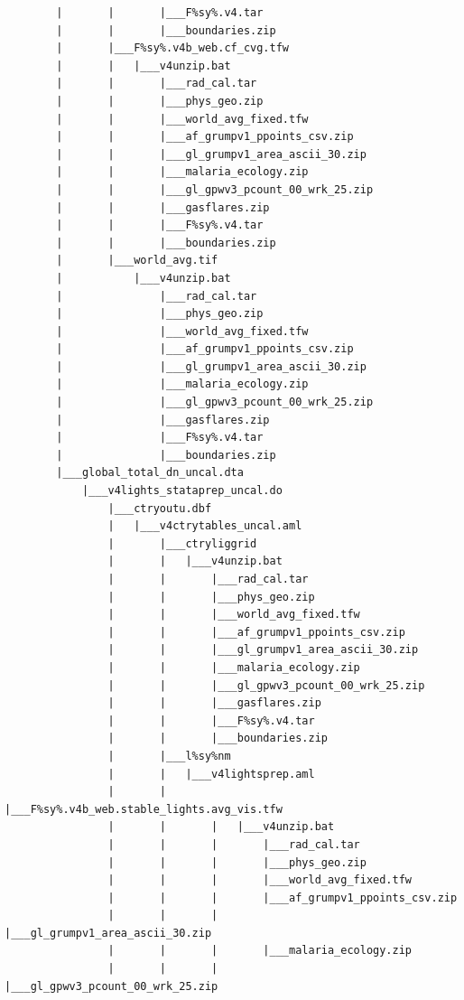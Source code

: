 \documentclass[]{book}
\begin{document}
\begin{verbatim}
        |       |       |___F%sy%.v4.tar
        |       |       |___boundaries.zip
        |       |___F%sy%.v4b_web.cf_cvg.tfw
        |       |   |___v4unzip.bat
        |       |       |___rad_cal.tar
        |       |       |___phys_geo.zip
        |       |       |___world_avg_fixed.tfw
        |       |       |___af_grumpv1_ppoints_csv.zip
        |       |       |___gl_grumpv1_area_ascii_30.zip
        |       |       |___malaria_ecology.zip
        |       |       |___gl_gpwv3_pcount_00_wrk_25.zip
        |       |       |___gasflares.zip
        |       |       |___F%sy%.v4.tar
        |       |       |___boundaries.zip
        |       |___world_avg.tif
        |           |___v4unzip.bat
        |               |___rad_cal.tar
        |               |___phys_geo.zip
        |               |___world_avg_fixed.tfw
        |               |___af_grumpv1_ppoints_csv.zip
        |               |___gl_grumpv1_area_ascii_30.zip
        |               |___malaria_ecology.zip
        |               |___gl_gpwv3_pcount_00_wrk_25.zip
        |               |___gasflares.zip
        |               |___F%sy%.v4.tar
        |               |___boundaries.zip
        |___global_total_dn_uncal.dta
            |___v4lights_stataprep_uncal.do
                |___ctryoutu.dbf
                |   |___v4ctrytables_uncal.aml
                |       |___ctryliggrid
                |       |   |___v4unzip.bat
                |       |       |___rad_cal.tar
                |       |       |___phys_geo.zip
                |       |       |___world_avg_fixed.tfw
                |       |       |___af_grumpv1_ppoints_csv.zip
                |       |       |___gl_grumpv1_area_ascii_30.zip
                |       |       |___malaria_ecology.zip
                |       |       |___gl_gpwv3_pcount_00_wrk_25.zip
                |       |       |___gasflares.zip
                |       |       |___F%sy%.v4.tar
                |       |       |___boundaries.zip
                |       |___l%sy%nm
                |       |   |___v4lightsprep.aml
                |       |       |___F%sy%.v4b_web.stable_lights.avg_vis.tfw
                |       |       |   |___v4unzip.bat
                |       |       |       |___rad_cal.tar
                |       |       |       |___phys_geo.zip
                |       |       |       |___world_avg_fixed.tfw
                |       |       |       |___af_grumpv1_ppoints_csv.zip
                |       |       |       |___gl_grumpv1_area_ascii_30.zip
                |       |       |       |___malaria_ecology.zip
                |       |       |       |___gl_gpwv3_pcount_00_wrk_25.zip

\end{verbatim}
\end{document}
